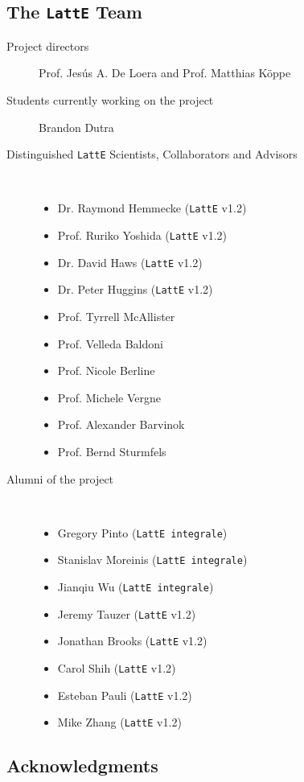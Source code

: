\documentclass{article}
\newcommand{\latte}{{\tt LattE}\xspace}
\newcommand{\latteInt}{{\tt LattE integrale}\xspace}
\begin{document}
\subsection{The {\tt LattE} Team}
\begin{description}
\item[Project directors]  Prof. Jes\'us A. De Loera and Prof. Matthias K\"oppe
\item[Students currently working on the project] Brandon Dutra
\item[Distinguished \latte Scientists, Collaborators and Advisors] \hfill \\
	\begin{itemize} 
		\item Dr. Raymond Hemmecke (\latte v1.2)
		\item Prof. Ruriko Yoshida (\latte v1.2)
		\item Dr. David Haws (\latte v1.2)
		\item Dr. Peter Huggins (\latte v1.2)
		\item Prof. Tyrrell McAllister
		\item Prof. Velleda Baldoni
		\item Prof. Nicole Berline
		\item Prof. Michele Vergne
		\item Prof. Alexander Barvinok
		\item Prof. Bernd Sturmfels 
	\end{itemize}
\item[Alumni of the project]	\hfill \\
	\begin{itemize}
		\item Gregory Pinto	(\latteInt)
		\item Stanislav Moreinis (\latteInt)
		\item Jianqiu Wu (\latteInt)
		\item Jeremy Tauzer (\latte v1.2)
		\item Jonathan Brooks (\latte v1.2)
		\item Carol Shih (\latte v1.2)
		\item Esteban Pauli (\latte v1.2)
		\item Mike Zhang	(\latte v1.2)
	\end{itemize}
\end{description}

\subsection{Acknowledgments}
\end{document}

